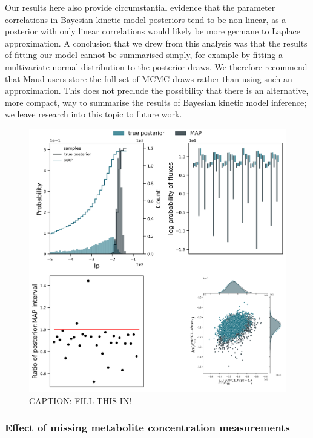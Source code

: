 \documentclass[journal=,manuscript=]{achemso}
\begin{document}
Our results here also provide circumstantial evidence that the parameter
correlations in Bayesian kinetic model posteriors tend to be non-linear,
as a posterior with only linear correlations would likely be more
germane to Laplace approximation. A conclusion that we drew from this
analysis was that the results of fitting our model cannot be summarised
simply, for example by fitting a multivariate normal distribution to the
posterior draws. We therefore recommend that Maud users store the full
set of MCMC draws rather than using such an approximation. This does not
preclude the possibility that there is an alternative, more compact, way
to summarise the results of Bayesian kinetic model inference; we leave
research into this topic to future work.

\begin{figure}

{\centering \includegraphics{./figures/laplace.png}

}

\caption{\label{fig-laplace}CAPTION: FILL THIS IN!}

\end{figure}

\hypertarget{effect-of-missing-metabolite-concentration-measurements}{%
\subsubsection{Effect of missing metabolite concentration
measurements}\label{effect-of-missing-metabolite-concentration-measurements}}
\end{document}
